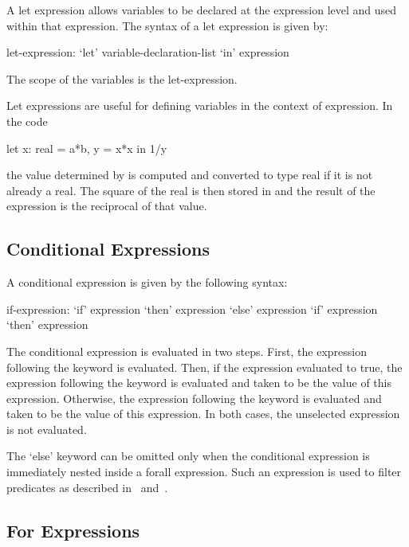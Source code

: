 A let expression allows variables to be declared at the expression
level and used within that expression.  The syntax of a let expression
is given by:
\begin{syntax}
let-expression:
  `let' variable-declaration-list `in' expression
\end{syntax}
The scope of the variables is the let-expression.
\begin{example}
Let expressions are useful for defining variables in the context of
expression.  In the code
\begin{chapel}
  let x: real = a*b, y = x*x in 1/y
\end{chapel}
the value determined by  is computed and converted to type
real if it is not already a real.  The square of the real is then
stored in  and the result of the expression is the reciprocal
of that value.
\end{example}

\subsection{Conditional Expressions}
\label{Conditional_Expressions}

A conditional expression is given by the following syntax:
\begin{syntax}
if-expression:
  `if' expression `then' expression `else' expression
  `if' expression `then' expression
\end{syntax}
The conditional expression is evaluated in two steps.  First, the
expression following the  keyword is evaluated.  Then, if the
expression evaluated to true, the expression following the 
keyword is evaluated and taken to be the value of this expression.
Otherwise, the expression following the  keyword is
evaluated and taken to be the value of this expression.  In both
cases, the unselected expression is not evaluated.

The `else' keyword can be omitted only when the conditional expression
is immediately nested inside a forall expression.  Such an expression
is used to filter predicates as described
in~ and~.

\subsection{For Expressions}
\label{For_Expressions}

